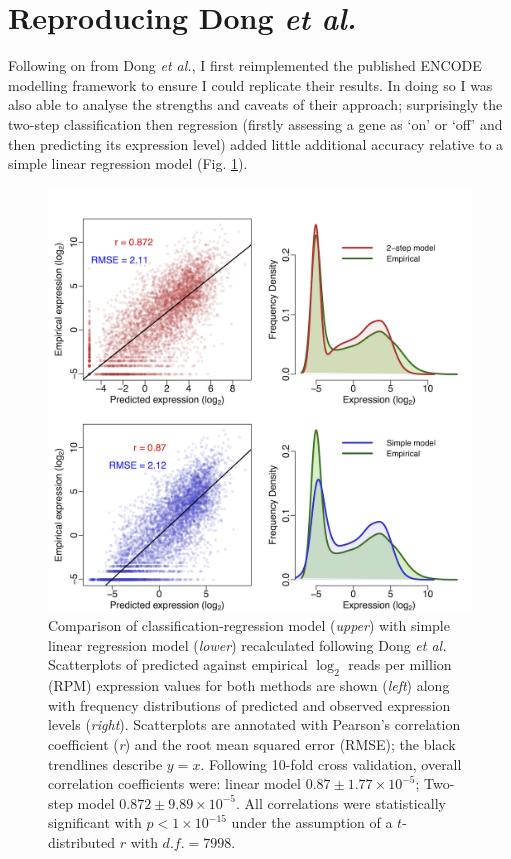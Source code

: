 \documentclass[a4paper,11pt,oneside]{book}
\begin{document}
\section{Reproducing Dong \emph{et al.} }

Following on from Dong \emph{et al.},\cite{Dong2012} I first
reimplemented the published ENCODE modelling framework to ensure I could
replicate their results. In doing so I was also able to analyse the
strengths and caveats of their approach; surprisingly the two-step classification
then regression (firstly assessing a gene as `on' or `off' and then
predicting its expression level) added little additional accuracy relative to a simple
linear regression model 
(Fig. \ref{fig:TwoStepvsSimple}). 

\begin{figure}
\begin{center}
\includegraphics[width=.7\textwidth]{figs/improvedDongPlot.png}
\captionsetup{width=\textwidth}
\caption{Comparison of classification-regression model (\emph{upper})
  with simple linear regression model (\emph{lower}) recalculated following Dong
  \emph{et al.}\cite{Dong2012} Scatterplots of predicted against empirical
  $\log_2$ reads per million (RPM) expression values for both methods are shown (\emph{left})
  along with frequency distributions of predicted and observed
  expression levels (\emph{right}). Scatterplots are annotated with
  Pearson's correlation coefficient (\emph{r}) and the root mean
  squared error (RMSE); the black trendlines describe $y =
  x$. Following 10-fold cross validation, overall correlation
  coefficients were: linear model $0.87 \pm 1.77 \times 10^{-5} $;
  Two-step model $0.872 \pm 9.89 \times 10^{-5} $. All correlations
  were statistically significant with $p < 1 \times 10^{-15}$ under the assumption of a
  $t$-distributed $r$ with $d.f. = 7998$.
}\label{fig:TwoStepvsSimple}
\end{center}
\end{figure} 
\end{document}
